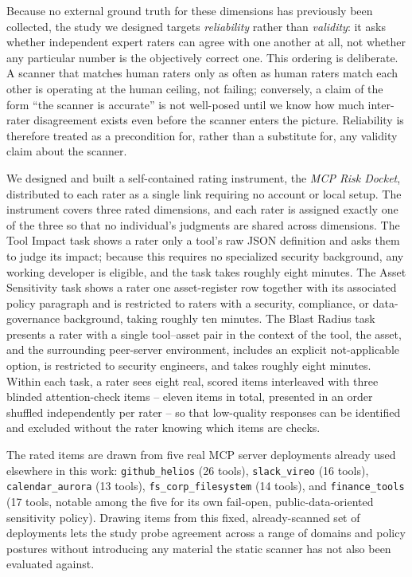 \documentclass[sigconf]{acmart}
\begin{document}
Because no external ground truth for these dimensions has previously been collected, the study we designed targets \emph{reliability} rather than \emph{validity}: it asks whether independent expert raters can agree with one another at all, not whether any particular number is the objectively correct one. This ordering is deliberate. A scanner that matches human raters only as often as human raters match each other is operating at the human ceiling, not failing; conversely, a claim of the form ``the scanner is accurate'' is not well-posed until we know how much inter-rater disagreement exists even before the scanner enters the picture. Reliability is therefore treated as a precondition for, rather than a substitute for, any validity claim about the scanner.

We designed and built a self-contained rating instrument, the \emph{MCP Risk Docket}, distributed to each rater as a single link requiring no account or local setup. The instrument covers three rated dimensions, and each rater is assigned exactly one of the three so that no individual's judgments are shared across dimensions. The Tool Impact task shows a rater only a tool's raw JSON definition and asks them to judge its impact; because this requires no specialized security background, any working developer is eligible, and the task takes roughly eight minutes. The Asset Sensitivity task shows a rater one asset-register row together with its associated policy paragraph and is restricted to raters with a security, compliance, or data-governance background, taking roughly ten minutes. The Blast Radius task presents a rater with a single tool--asset pair in the context of the tool, the asset, and the surrounding peer-server environment, includes an explicit not-applicable option, is restricted to security engineers, and takes roughly eight minutes. Within each task, a rater sees eight real, scored items interleaved with three blinded attention-check items -- eleven items in total, presented in an order shuffled independently per rater -- so that low-quality responses can be identified and excluded without the rater knowing which items are checks.

The rated items are drawn from five real MCP server deployments already used elsewhere in this work: \texttt{github\_helios} (26 tools), \texttt{slack\_vireo} (16 tools), \texttt{calendar\_aurora} (13 tools), \texttt{fs\_corp\_filesystem} (14 tools), and \texttt{finance\_tools} (17 tools, notable among the five for its own fail-open, public-data-oriented sensitivity policy). Drawing items from this fixed, already-scanned set of deployments lets the study probe agreement across a range of domains and policy postures without introducing any material the static scanner has not also been evaluated against.
\end{document}
